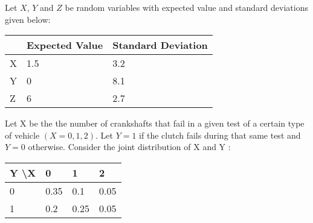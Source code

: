 \documentclass[addpoints]{examsetup}
\begin{document}
\begin{questions}

\newpage

\question
Let $X$, $Y$ and $Z$ be random variables with expected value and standard deviations given below:


 \begin{table}[h!]
     \centering
     \begin{tabular}{lll}
        \hline
           & Expected Value  & Standard Deviation    \\\hline \hline
         X &    1.5          &  3.2   \\
         Y &    0            &  8.1   \\
         Z &    6            &  2.7   \\\hline \hline

     \end{tabular}
  \end{table}
    

\question
Let X be the the number of crankshafts that fail in a given test of a certain type of vehicle $(X = 0, 1, 2)$. Let $Y = 1$ if the clutch fails during that same test and $Y = 0$ otherwise. Consider the joint distribution of X and Y :

 \begin{table}[h!]
     \centering
     \begin{tabular}{llll}
        \hline
         Y \textbackslash  X  &  0    &  1   & 2 \\\hline \hline
         0      &  0.35 &  0.1 & 0.05   \\
         1      &  0.2  & 0.25 & 0.05   \\ \hline\hline


\end{tabular}
\end{table}
\end{questions}
\end{document}
